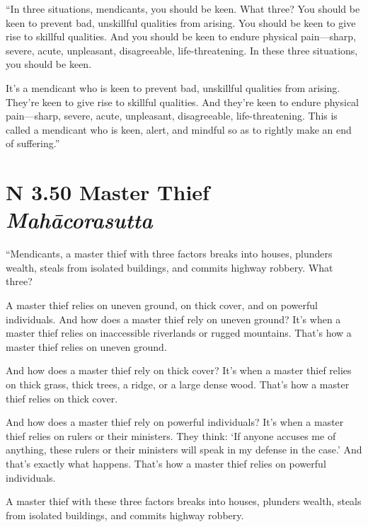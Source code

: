 \documentclass[12pt,openany]{book}%
\newcommand*{\suttatitleacronym}[1]{\smaller[2]{#1}\vspace*{.3em}}
\newcommand*{\suttatitletranslation}[1]{\linebreak{#1}}
\newcommand*{\suttatitleroot}[1]{\linebreak\smaller[2]\itshape{#1}}
\newcommand*{\tocacronym}[1]{\hspace*{-3.3em}{#1}\quad}
\newcommand*{\toctranslation}[1]{#1}
\newcommand*{\tocroot}[1]{(\textit{#1})}
\begin{document}
“In three situations, mendicants, you should be keen. What three? You should be keen to prevent bad, unskillful qualities from arising. You should be keen to give rise to skillful qualities. And you should be keen to endure physical pain—sharp, severe, acute, unpleasant, disagreeable, life-threatening. In these three situations, you should be keen. 

It’s a mendicant who is keen to prevent bad, unskillful qualities from arising. They’re keen to give rise to skillful qualities. And they’re keen to endure physical pain—sharp, severe, acute, unpleasant, disagreeable, life-threatening. This is called a mendicant who is keen, alert, and mindful so as to rightly make an end of suffering.” 

%
\section*{{\suttatitleacronym AN 3.50}{\suttatitletranslation A Master Thief }{\suttatitleroot Mahācorasutta}}
\addcontentsline{toc}{section}{\tocacronym{AN 3.50} \toctranslation{A Master Thief } \tocroot{Mahācorasutta}}

“Mendicants, a master thief with three factors breaks into houses, plunders wealth, steals from isolated buildings, and commits highway robbery. What three? 

A master thief relies on uneven ground, on thick cover, and on powerful individuals. And how does a master thief rely on uneven ground? It’s when a master thief relies on inaccessible riverlands or rugged mountains. That’s how a master thief relies on uneven ground. 

And how does a master thief rely on thick cover? It’s when a master thief relies on thick grass, thick trees, a ridge, or a large dense wood. That’s how a master thief relies on thick cover. 

And how does a master thief rely on powerful individuals? It’s when a master thief relies on rulers or their ministers. They think: ‘If anyone accuses me of anything, these rulers or their ministers will speak in my defense in the case.’ And that’s exactly what happens. That’s how a master thief relies on powerful individuals. 

A master thief with these three factors breaks into houses, plunders wealth, steals from isolated buildings, and commits highway robbery. 
\end{document}
